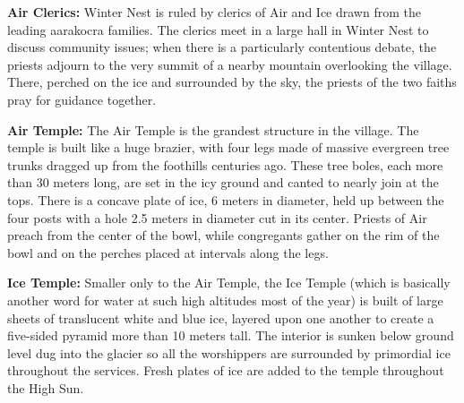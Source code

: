 {
	\textbf{Air Clerics:} Winter Nest is ruled by clerics of Air and Ice drawn from the leading aarakocra families. The clerics meet in a large hall in Winter Nest to discuss community issues; when there is a particularly contentious debate, the priests adjourn to the very summit of a nearby mountain overlooking the village. There, perched on the ice and surrounded by the sky, the priests of the two faiths pray for guidance together.	
}
{}
{
	\textbf{Air Temple:} The Air Temple is the grandest structure in the village. The temple is built like a huge brazier, with four legs made of massive evergreen tree trunks dragged up from the foothills centuries ago. These tree boles, each more than 30 meters long, are set in the icy ground and canted to nearly join at the tops. There is a concave plate of ice, 6 meters in diameter, held up between the four posts with a hole 2.5 meters in diameter cut in its center. Priests of Air preach from the center of the bowl, while congregants gather on the rim of the bowl and on the perches placed at intervals along the legs.

	\textbf{Ice Temple:} Smaller only to the Air Temple, the Ice Temple (which is basically another word for water at such high altitudes most of the year) is built of large sheets of translucent white and blue ice, layered upon one another to create a five-sided pyramid more than 10 meters tall. The interior is sunken below ground level dug into the glacier so all the worshippers are surrounded by primordial ice throughout the services. Fresh plates of ice are added to the temple throughout the High Sun.
}
